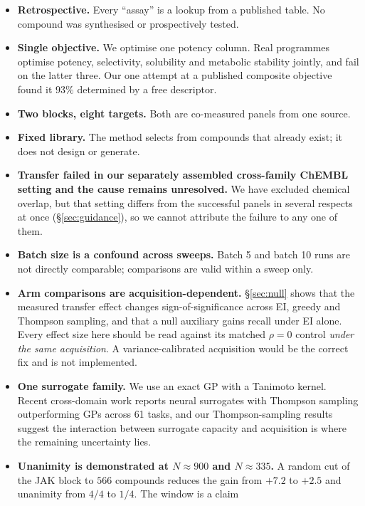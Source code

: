 \documentclass[11pt]{article}
\begin{document}
\begin{itemize}[leftmargin=1.6em,itemsep=0.2em]
  \item \textbf{Retrospective.} Every ``assay'' is a lookup from a published
    table. No compound was synthesised or prospectively tested.
  \item \textbf{Single objective.} We optimise one potency column. Real
    programmes optimise potency, selectivity, solubility and metabolic stability
    jointly, and fail on the latter three. Our one attempt at a published
    composite objective found it $93\%$ determined by a free descriptor.
  \item \textbf{Two blocks, eight targets.} Both are co-measured panels from one
    source.
  \item \textbf{Fixed library.} The method selects from compounds that already
    exist; it does not design or generate.
  \item \textbf{Transfer failed in our separately assembled cross-family
    ChEMBL setting and the cause remains unresolved.} We have excluded chemical
    overlap, but that setting differs from the successful panels in several
    respects at once (\S\ref{sec:guidance}), so we cannot attribute the failure
    to any one of them.
  \item \textbf{Batch size is a confound across sweeps.} Batch 5 and batch 10
    runs are not directly comparable; comparisons are valid within a sweep only.
  \item \textbf{Arm comparisons are acquisition-dependent.} \S\ref{sec:null}
    shows that the measured transfer effect changes sign-of-significance across
    EI, greedy and Thompson sampling, and that a null auxiliary gains recall
    under EI alone. Every effect size here should be read against its matched
    $\rho = 0$ control \emph{under the same acquisition}. A variance-calibrated
    acquisition would be the correct fix and is not implemented.
  \item \textbf{One surrogate family.} We use an exact GP with a Tanimoto
    kernel. Recent cross-domain work reports neural surrogates with Thompson
    sampling outperforming GPs across 61 tasks, and our Thompson-sampling
    results suggest the interaction between surrogate capacity and acquisition
    is where the remaining uncertainty lies.
  \item \textbf{Unanimity is demonstrated at $N \approx 900$ and $N \approx
    335$.} A random cut of the JAK block to $566$ compounds reduces the gain from
    $+7.2$ to $+2.5$ and unanimity from $4/4$ to $1/4$. The window is a claim

\end{itemize}
\end{document}
